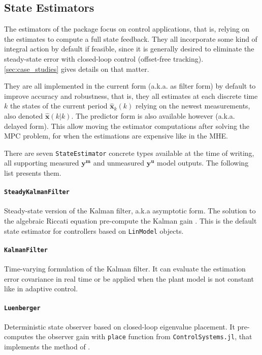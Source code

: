 \subsection{State Estimators}

The estimators of the package focus on control applications, that is, relying on the estimates to compute a full state feedback. They all incorporate some kind of integral action by default if feasible, since it is generally desired to eliminate the steady-state error with closed-loop control (offset-free tracking). \cref{sec:case_studies} gives details on that matter.

They are all implemented in the current form (a.k.a. as filter form) by default to improve accuracy and robustness, that is, they all estimates at each discrete time $k$ the states of the current period $\mathbf{\hat{x}}_k(k)$ relying on the newest measurements, also denoted $\mathbf{\hat{x}}(k|k)$. The predictor form is also available however (a.k.a. delayed form). This allow moving the estimator computations after solving the MPC problem, for when the estimations are expensive like in the MHE.

There are seven \texttt{StateEstimator} concrete types available at the time of writing, all supporting measured $\mathbf{y^m}$ and unmeasured $\mathbf{y^u}$ model outputs. The following list presents them.

\paragraph{\texttt{SteadyKalmanFilter}}
Steady-state version of the Kalman filter, a.k.a asymptotic form. The solution to the algebraic Riccati equation pre-compute the Kalman gain \citep{simon}. This is the default state estimator for controllers based on \texttt{LinModel} objects.

\paragraph{\texttt{KalmanFilter}}
Time-varying formulation of the Kalman filter. It can evaluate the estimation error covariance in real time or be applied when the plant model is not constant like in adaptive control.

\paragraph{\texttt{Luenberger}}
Deterministic state observer based on closed-loop eigenvalue placement. It pre-computes the observer gain with \texttt{place} function from \texttt{ControlSystems.jl}, that implements the method of \citet{placePoles}.

